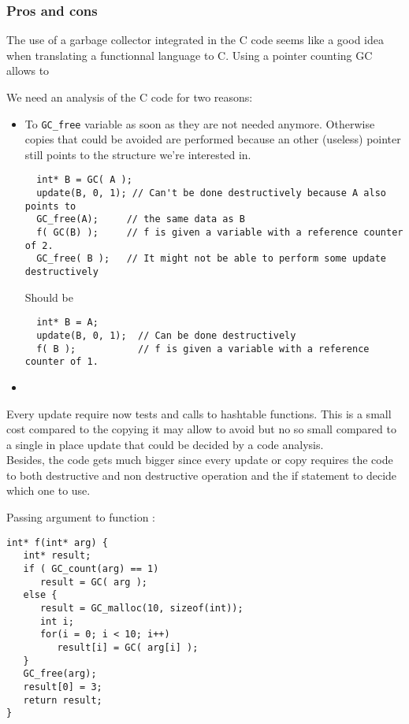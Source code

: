 \documentclass[12pt,a4paper]{article}
\newcommand{\cl}[1]{\texttt{#1}}
\begin{document}
\subsubsection{Pros and cons}

The use of a garbage collector integrated in the C code seems like a good idea when translating a functionnal language to C. Using a pointer counting GC allows to 

We need an analysis of the C code for two reasons:
\begin{itemize}
\item To \cl{GC\_free} variable as soon as they are not needed anymore. Otherwise copies that could be avoided are performed because an other (useless) pointer still points to the structure we're interested in.
\begin{lstlisting}
  int* B = GC( A );
  update(B, 0, 1); // Can't be done destructively because A also points to
  GC_free(A);     // the same data as B
  f( GC(B) );     // f is given a variable with a reference counter of 2.
  GC_free( B );   // It might not be able to perform some update destructively
\end{lstlisting}
Should be
\begin{lstlisting}
  int* B = A;
  update(B, 0, 1);  // Can be done destructively
  f( B );           // f is given a variable with a reference counter of 1.
\end{lstlisting}
\item 
\end{itemize}

Every update require now tests and calls to hashtable functions. This is a small cost compared to the copying it may allow to avoid but no so small compared to a single in place update that could be decided by a code analysis.\\

Besides, the code gets much bigger since every update or copy requires the code to both destructive and non destructive operation and the if statement to decide which one to use.

Passing argument to function :
\begin{lstlisting}
int* f(int* arg) {
   int* result;
   if ( GC_count(arg) == 1)
      result = GC( arg );
   else {
      result = GC_malloc(10, sizeof(int));
      int i;
      for(i = 0; i < 10; i++)
         result[i] = GC( arg[i] );
   }
   GC_free(arg);
   result[0] = 3;
   return result;
}
\end{lstlisting}
\end{document}
